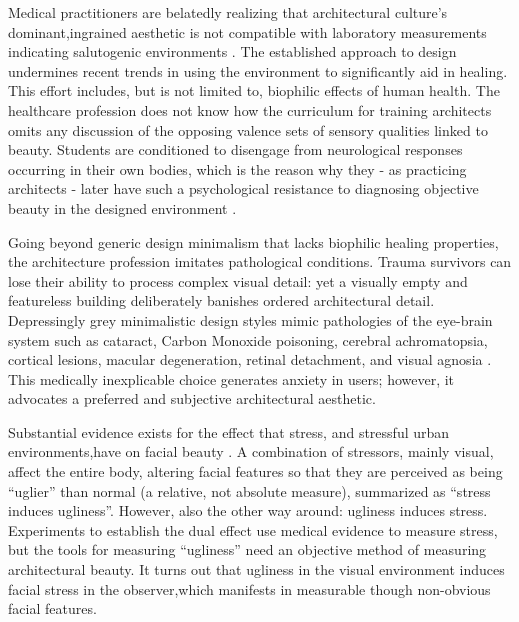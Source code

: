 \documentclass[a4paper]{article}
\begin{document}
Medical practitioners are belatedly realizing that architectural culture’s dominant,ingrained aesthetic is not compatible with laboratory measurements indicating salutogenic environments \cite{seresinhe_using_2017,seresinhe_quantifying_2015,bates_humanizing_2018,mittelmark_handbook_2017,golembiewski_designed_2016,inalhan_start_2010}. The established approach to design undermines recent trends in using the environment to significantly aid in healing. This effort includes, but is not limited to, biophilic effects of human health. The healthcare profession does not know how the curriculum for training architects omits any discussion of the opposing valence sets of sensory qualities linked to beauty. Students are conditioned to disengage from neurological responses occurring in their own bodies, which is the reason why they - as practicing architects - later have such a psychological resistance to diagnosing objective beauty in the designed environment \cite{salingaros_what_2017}.

Going beyond generic design minimalism that lacks biophilic healing properties, the architecture profession imitates pathological conditions. Trauma survivors can lose their ability to process complex visual detail: yet a visually empty and featureless building deliberately banishes ordered architectural detail. Depressingly grey minimalistic design styles mimic pathologies of the eye-brain system such as cataract, Carbon Monoxide poisoning, cerebral achromatopsia, cortical lesions, macular degeneration, retinal detachment, and visual agnosia \cite[Chapter 4]{salingaros_theory_2008}. This medically inexplicable choice generates anxiety in users; however, it advocates a preferred and subjective architectural aesthetic.

Substantial evidence exists for the effect that stress, and stressful urban environments,have on facial beauty \cite{moore_evidence_2011}. A combination of stressors, mainly visual, affect the entire body, altering facial features so that they are perceived as being “uglier” than normal (a relative, not absolute measure), summarized as “stress induces ugliness”. However, also the other way around: ugliness induces stress. Experiments to establish the dual effect use medical evidence to measure stress, but the tools for measuring “ugliness” need an objective method of measuring architectural beauty. It turns out that ugliness in the visual environment induces facial stress in the observer,which manifests in measurable though non-obvious facial features.
\end{document}
